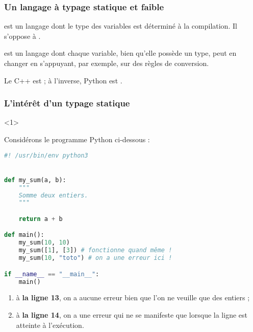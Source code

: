 \documentclass{cppcourses}
\begin{document}
\begin{frame}

\frametitle{Un langage à typage statique et faible}

\begin{definition}
 est un langage dont le type des variables est déterminé à la compilation. Il s'oppose à .
\end{definition}

\begin{definition}
 est un langage dont chaque variable, bien qu'elle possède un type, peut en changer en s'appuyant, par exemple, sur des règles de conversion.
\end{definition}

Le C++ est  ; à l'inverse, Python est .

\end{frame}

\begin{frame}[fragile]

\frametitle{L'intérêt d'un typage statique}

\begin{example}

\begin{onlyenv}<1>

Considérons le programme Python ci-dessous :

\begin{lstlisting}[language = Python]
#! /usr/bin/env python3


def my_sum(a, b):
    """
    Somme deux entiers.
    """

    return a + b

def main():
    my_sum(10, 10)
    my_sum([1], [3]) # fonctionne quand même !
    my_sum(10, "toto") # on a une erreur ici !

if __name__ == "__main__":
    main()
\end{lstlisting}

\end{onlyenv}


\begin{enumerate}
    \item<only@2- | uncover@3-> à \textbf{la ligne 13}, on a aucune erreur bien que l'on ne veuille que des entiers ;
    \item<only@2- | uncover@4-> à \textbf{la ligne 14}, on a une erreur qui ne se manifeste que lorsque la ligne est atteinte à l'exécution.
\end{enumerate}


\end{example}

\end{frame}
\end{document}
